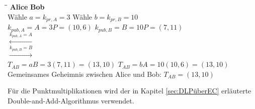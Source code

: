 \begin{tabbing}
\qquad \qquad \qquad \qquad \qquad \qquad \qquad \qquad \= \qquad \qquad \qquad \= \qquad \qquad \qquad \qquad \qquad \qquad \qquad \qquad \kill
\textbf{Alice} \> \> \textbf{Bob}\\
Wähle $a=k_{pr,A} = 3$ \> \> Wähle $b=k_{pr,B} = 10$\\
$k_{pub,A} = A = 3P = (10,6)$ \> \> $k_{pub,B} = B = 10P = (7,11)$\\
\> $\xleftarrow{k_{pub,A} = A}$ \> \\
\> $\xrightarrow{k_{pub,B} = B}$ \> \\
$T_{AB} = aB = 3(7,11) = (13,10)$ \> \> $T_{AB} = bA = 10(10,6) = (13,10)$\\
Gemeinsames Geheimnis zwischen Alice und Bob: $T_{AB} = (13,10)$\\
\end{tabbing}
Für die Punktmultiplikationen wird der in Kapitel \ref{sec:DLPüberEC} erläuterte Double-and-Add-Algorithmus verwendet.






































